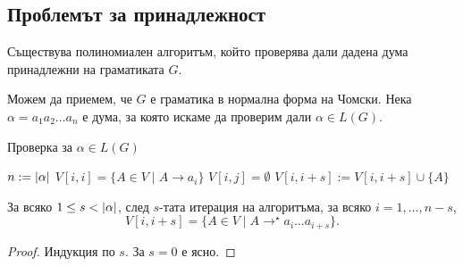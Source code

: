 \subsection{Проблемът за принадлежност}

\begin{thm}
  Съществува полиномиален алгоритъм, който проверява дали дадена дума принадлежни на граматиката $G$.
\end{thm}
Можем да приемем, че $G$ е граматика в нормална форма на Чомски.
Нека $\alpha = a_1a_2\dots a_n$ е дума, за която искаме да проверим дали $\alpha \in L(G)$.
\begin{algorithm}[H]
  \caption{Проверка за $\alpha \in L(G)$}
  \label{alg:belongs-to-grammar}
  \begin{algorithmic}[1]
    \STATE $n := \vert{\alpha}\vert$
    \STATE $V[i,i] = \{A \in V \mid A\rightarrow a_i\}$
    \ENDFOR
    \STATE $V[i,j] = \emptyset$
    \ENDFOR      
    \FORALL[Колко дълъг е интервала]{$s \in [1, n)$}%
    \FORALL[Как разделяме интервала]{$k \in [i, i + s)$}%
    \STATE $V[i,i+s] := V[i,i+s] \cup \{A\}$
    \ENDIF
    \ENDFOR
    \ENDFOR
    \ENDFOR
    \RETURN \TRUE
    \ELSE
    \RETURN \FALSE
    \ENDIF
  \end{algorithmic}
\end{algorithm}

\begin{lemma}
  За всяко $1 \leq s < \vert{\alpha}\vert$, след $s$-тата итерация на алгоритъма, за всяко $i = 1,\dots,n-s$,
  \[V[i,i+s] = \{A \in V \mid A \rightarrow^\star a_i\dots a_{i+s}\}.\]
\end{lemma}
\begin{proof}
  Индукция по $s$.
  За $s = 0$  е ясно.
\end{proof}



